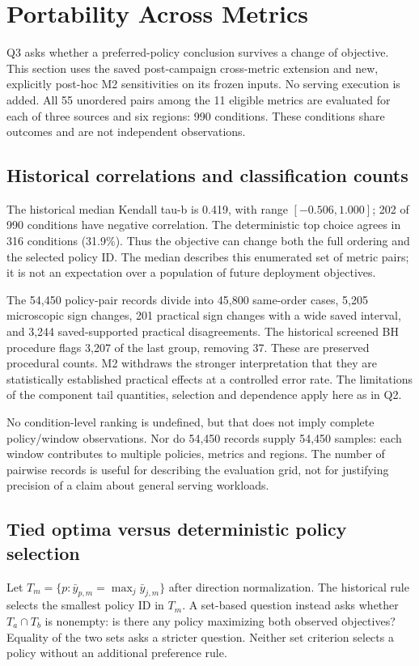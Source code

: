 \section{Portability Across Metrics}\label{sec:results-cross-metric}
Q3 asks whether a preferred-policy conclusion survives a change of objective.
This section uses the saved post-campaign cross-metric extension and new,
explicitly post-hoc M2 sensitivities on its frozen inputs. No serving
execution is added. All 55 unordered pairs among the 11 eligible metrics
are evaluated for each of three sources and six regions: 990 conditions.
These conditions share outcomes and are not independent observations.

\subsection{Historical correlations and classification counts}
The historical median Kendall tau-b is 0.419, with range $[-0.506,1.000]$;
202 of 990 conditions have negative correlation. The deterministic top
choice agrees in 316 conditions (31.9\%). Thus the objective can change
both the full ordering and the selected policy ID. The median describes
this enumerated set of metric pairs; it is not an expectation over a
population of future deployment objectives.

The 54,450 policy-pair records divide into 45,800 same-order cases,
5,205 microscopic sign changes, 201 practical sign changes with a wide
saved interval, and 3,244 saved-supported practical disagreements. The
historical screened BH procedure flags 3,207 of the last group, removing
37. These are preserved procedural counts. M2 withdraws the stronger
interpretation that they are statistically established practical effects
at a controlled error rate. The limitations of the component tail
quantities, selection and dependence apply here as in Q2.

No condition-level ranking is undefined, but that does not imply complete
policy/window observations. Nor do 54,450 records supply 54,450 samples:
each window contributes to multiple policies, metrics and regions. The
number of pairwise records is useful for describing the evaluation grid,
not for justifying precision of a claim about general serving workloads.

\subsection{Tied optima versus deterministic policy selection}
Let $T_m=\{p:\bar y_{p,m}=\max_j\bar y_{j,m}\}$ after direction
normalization. The historical rule selects the smallest policy ID in
$T_m$. A set-based question instead asks whether $T_a\cap T_b$ is
nonempty: is there any policy maximizing both observed objectives?
Equality of the two sets asks a stricter question. Neither set criterion
selects a policy without an additional preference rule.

